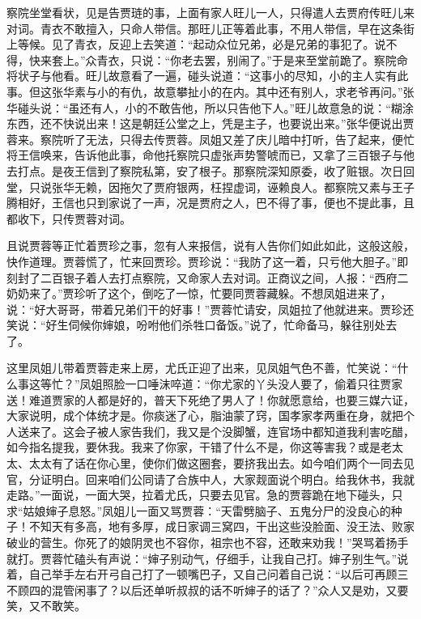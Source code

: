 察院坐堂看状，见是告贾琏的事，上面有家人旺儿一人，只得遣人去贾府传旺儿来对词。青衣不敢擅入，只命人带信。那旺儿正等着此事，不用人带信，早在这条街上等候。见了青衣，反迎上去笑道：``起动众位兄弟，必是兄弟的事犯了。说不得，快来套上。''众青衣，只说：``你老去罢，别闹了。''于是来至堂前跪了。察院命将状子与他看。旺儿故意看了一遍，碰头说道：``这事小的尽知，小的主人实有此事。但这张华素与小的有仇，故意攀扯小的在内。其中还有别人，求老爷再问。''张华碰头说：``虽还有人，小的不敢告他，所以只告他下人。''旺儿故意急的说：``糊涂东西，还不快说出来！这是朝廷公堂之上，凭是主子，也要说出来。''张华便说出贾蓉来。察院听了无法，只得去传贾蓉。凤姐又差了庆儿暗中打听，告了起来，便忙将王信唤来，告诉他此事，命他托察院只虚张声势警唬而已，又拿了三百银子与他去打点。是夜王信到了察院私第，安了根子。那察院深知原委，收了赃银。次日回堂，只说张华无赖，因拖欠了贾府银两，枉捏虚词，诬赖良人。都察院又素与王子腾相好，王信也只到家说了一声，况是贾府之人，巴不得了事，便也不提此事，且都收下，只传贾蓉对词。

且说贾蓉等正忙着贾珍之事，忽有人来报信，说有人告你们如此如此，这般这般，快作道理。贾蓉慌了，忙来回贾珍。贾珍说：``我防了这一着，只亏他大胆子。''即刻封了二百银子着人去打点察院，又命家人去对词。正商议之间，人报：``西府二奶奶来了。''贾珍听了这个，倒吃了一惊，忙要同贾蓉藏躲。不想凤姐进来了，说：``好大哥哥，带着兄弟们干的好事！''贾蓉忙请安，凤姐拉了他就进来。贾珍还笑说：``好生伺候你婶娘，吩咐他们杀牲口备饭。''说了，忙命备马，躲往别处去了。

这里凤姐儿带着贾蓉走来上房，尤氏正迎了出来，见凤姐气色不善，忙笑说：``什么事这等忙？''凤姐照脸一口唾沫啐道：``你尤家的丫头没人要了，偷着只往贾家送！难道贾家的人都是好的，普天下死绝了男人了！你就愿意给，也要三媒六证，大家说明，成个体统才是。你痰迷了心，脂油蒙了窍，国孝家孝两重在身，就把个人送来了。这会子被人家告我们，我又是个没脚蟹，连官场中都知道我利害吃醋，如今指名提我，要休我。我来了你家，干错了什么不是，你这等害我？或是老太太、太太有了话在你心里，使你们做这圈套，要挤我出去。如今咱们两个一同去见官，分证明白。回来咱们公同请了合族中人，大家觌面说个明白。给我休书，我就走路。''一面说，一面大哭，拉着尤氏，只要去见官。急的贾蓉跪在地下碰头，只求``姑娘婶子息怒。''凤姐儿一面又骂贾蓉：``天雷劈脑子、五鬼分尸的没良心的种子！不知天有多高，地有多厚，成日家调三窝四，干出这些没脸面、没王法、败家破业的营生。你死了的娘阴灵也不容你，祖宗也不容，还敢来劝我！''哭骂着扬手就打。贾蓉忙磕头有声说：``婶子别动气，仔细手，让我自己打。婶子别生气。''说着，自己举手左右开弓自己打了一顿嘴巴子，又自己问着自己说：``以后可再顾三不顾四的混管闲事了？以后还单听叔叔的话不听婶子的话了？''众人又是劝，又要笑，又不敢笑。


